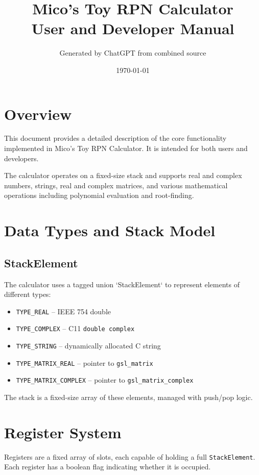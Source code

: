 \documentclass[12pt]{article}
\title{Mico's Toy RPN Calculator\\\large User and Developer Manual}
\author{Generated by ChatGPT from combined source}
\date{\today}
\begin{document}
\maketitle
\tableofcontents
\newpage

\section{Overview}

This document provides a detailed description of the core functionality implemented in Mico's Toy RPN Calculator. It is intended for both users and developers.

The calculator operates on a fixed-size stack and supports real and complex numbers, strings, real and complex matrices, and various mathematical operations including polynomial evaluation and root-finding.

\section{Data Types and Stack Model}

\subsection{StackElement}
The calculator uses a tagged union `StackElement` to represent elements of different types:

\begin{itemize}
  \item \texttt{TYPE\_REAL} -- IEEE 754 double
  \item \texttt{TYPE\_COMPLEX} -- C11 \texttt{double complex}
  \item \texttt{TYPE\_STRING} -- dynamically allocated C string
  \item \texttt{TYPE\_MATRIX\_REAL} -- pointer to \texttt{gsl\_matrix}
  \item \texttt{TYPE\_MATRIX\_COMPLEX} -- pointer to \texttt{gsl\_matrix\_complex}
\end{itemize}

The stack is a fixed-size array of these elements, managed with push/pop logic.

\section{Register System}

Registers are a fixed array of slots, each capable of holding a full \texttt{StackElement}. Each register has a boolean flag indicating whether it is occupied. 
\end{document}
